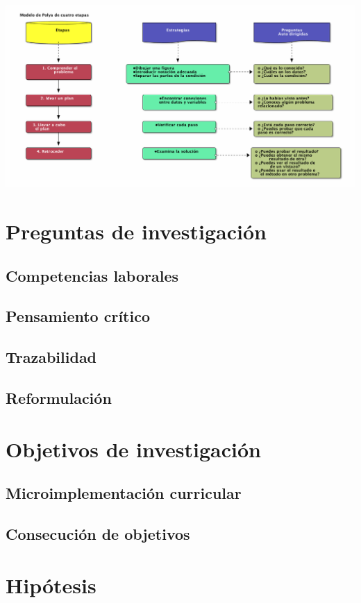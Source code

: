 \documentclass[12pt,letterpaper,article,x11names]{memoir}
\begin{document}
\begin{center}
\includegraphics[width=.9\linewidth]{images/polya.png}
\end{center}


\section{Preguntas de investigación}
\label{sec:org7d3b614}
\subsection{Competencias laborales}
\label{sec:org5c636ad}
\subsection{Pensamiento crítico}
\label{sec:org51e36eb}
\subsection{Trazabilidad}
\label{sec:org4a18445}
\subsection{Reformulación}
\label{sec:org111f70b}
\section{Objetivos de investigación}
\label{sec:org7dfd3b6}
\subsection{Microimplementación curricular}
\label{sec:org285f4bc}
\subsection{Consecución de objetivos}
\label{sec:org5497b0e}
\section{Hipótesis}
\label{sec:orge791c1f}
\end{document}
